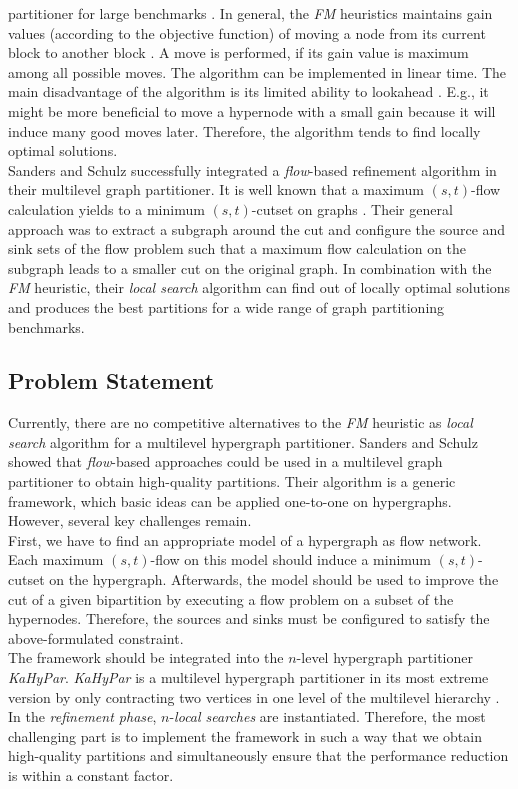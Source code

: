 partitioner for large benchmarks \cite{papa2007hypergraph}. In general, the \emph{FM}
heuristics maintains gain values (according to the objective function) of moving a node
from its current block to another block \cite{fiduccia1988linear}. A move is performed, 
if its gain value is maximum among all possible moves. The algorithm can be implemented 
in linear time. The main disadvantage of the algorithm is its limited ability to lookahead
\cite{zhao2002effective}. E.g., it might be more beneficial to move a hypernode with 
a small gain because it will induce many good moves later. Therefore, the algorithm
tends to find locally optimal solutions. \\ 
Sanders and Schulz \cite{sanders2011engineering} successfully integrated a \emph{flow}-based refinement
algorithm in their multilevel graph partitioner. It is well known that a maximum $(s,t)$-flow
calculation yields to a minimum $(s,t)$-cutset on graphs \cite{ford1956maximal}. Their general
approach was to extract a subgraph around the cut and configure the source and sink sets
of the flow problem such that a maximum flow calculation on the subgraph leads to a 
smaller cut on the original graph. In combination with the \emph{FM} heuristic, their \emph{local
search} algorithm can find out of locally optimal solutions and produces
the best partitions for a wide range of graph partitioning benchmarks.

\subsection{Problem Statement}

Currently, there are no competitive alternatives to the \emph{FM} heuristic as \emph{local search}
algorithm for a multilevel hypergraph partitioner. Sanders and Schulz \cite{sanders2011engineering}
showed that \emph{flow}-based approaches could be used in a multilevel graph partitioner to obtain
high-quality partitions. Their algorithm is a generic framework, which basic ideas can be
applied one-to-one on hypergraphs. However, several key challenges remain.\\
First, we have to find an appropriate model of a hypergraph as flow network. Each maximum
$(s,t)$-flow on this model should induce a minimum $(s,t)$-cutset on the hypergraph.
Afterwards, the model should be used to improve the cut of a given bipartition by
executing a flow problem on a subset of the hypernodes. Therefore, the 
sources and sinks must be configured to satisfy the above-formulated constraint. \\
The framework should be integrated into the $n$-level hypergraph partitioner 
\emph{KaHyPar}. \emph{KaHyPar} is a multilevel hypergraph partitioner in its most extreme 
version by only contracting two vertices in one level of the multilevel hierarchy
\cite{akhremtsev2017engineering,heuer2017improving,schlag2016k}. In the \emph{refinement 
phase}, $n$-\emph{local searches} are instantiated. Therefore, the most challenging part is
to implement the framework in such a way that we obtain
high-quality partitions and simultaneously ensure that the performance reduction is within
a constant factor.

